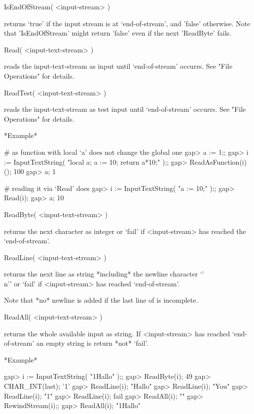 \>IsEndOfStream( <input-stream> )

returns `true' if  the input stream  is  at `end-of-stream', and  'false'
otherwise.  Note  that 'IsEndOfStream' might return  'false' even  if the
next 'ReadByte' fails.

\>Read( <input-text-stream> )

reads the input-text-stream as input  until `end-of-stream' occurrs.  See
"File Operations" for details.

\>ReadTest( <input-text-stream> )

reads the input-text-stream as  test input until `end-of-stream' occurrs.
See "File Operations" for details.

*Example*

\beginexample
    # as function with local `a' does not change the global one
    gap> a := 1;;
    gap> i := InputTextString( "local a; a := 10; return a*10;" );;
    gap> ReadAsFunction(i)();
    100
    gap> a;
    1

    # reading it via `Read' does
    gap> i := InputTextString( "a := 10;" );;                      
    gap> Read(i);
    gap> a;
    10
\endexample

\>ReadByte( <input-text-stream> )

returns the  next character as  integer  or `fail'  if <input-stream> has
reached the `end-of-stream'.

\>ReadLine( <input-text-stream> )

returns  the   next line as   string  *including*  the  newline character
`{'\\n'}' or `fail' if <input-stream> has reached `end-of-stream'.

Note that *no* newline is added if the last line of is incomplete.

\>ReadAll( <input-text-stream> )

returns   the  whole available input as    string.  If <input-stream> has
reached `end-of-stream' an empty string is return *not* `fail'.

*Example*

\beginexample
   gap> i := InputTextString( "1Hallo\nYou{}" );;
   gap> ReadByte(i);
   49
   gap> CHAR_INT(last);
   '1'
   gap> ReadLine(i);
   "Hallo\n"
   gap> ReadLine(i);
   "You\n"
   gap> ReadLine(i);
   "1"
   gap> ReadLine(i);
   fail
   gap> ReadAll(i);
   ""
   gap> RewindStream(i);;
   gap> ReadAll(i);     
   "1Hallo\nYou{}"
\endexample


